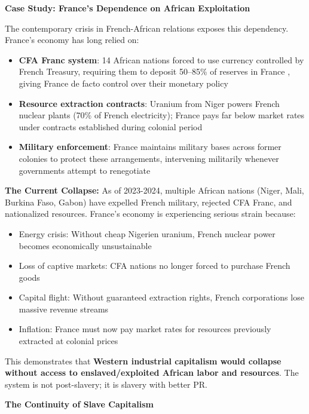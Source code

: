 \documentclass[12pt,openany]{book}
\begin{document}
\textbf{Case Study: France's Dependence on African Exploitation}

The contemporary crisis in French-African relations exposes this dependency. France's economy has long relied on:

\begin{itemize}
    \item \textbf{CFA Franc system}: 14 African nations forced to use currency controlled by French Treasury, requiring them to deposit 50--85\% of reserves in France \cite{pigeaud}, giving France de facto control over their monetary policy
    \item \textbf{Resource extraction contracts}: Uranium from Niger powers French nuclear plants (70\% of French electricity); France pays far below market rates under contracts established during colonial period
    \item \textbf{Military enforcement}: France maintains military bases across former colonies to protect these arrangements, intervening militarily whenever governments attempt to renegotiate
\end{itemize}

\textbf{The Current Collapse:} As of 2023-2024, multiple African nations (Niger, Mali, Burkina Faso, Gabon) have expelled French military, rejected CFA Franc, and nationalized resources. France's economy is experiencing serious strain because:

\begin{itemize}
    \item Energy crisis: Without cheap Nigerien uranium, French nuclear power becomes economically unsustainable
    \item Loss of captive markets: CFA nations no longer forced to purchase French goods
    \item Capital flight: Without guaranteed extraction rights, French corporations lose massive revenue streams
    \item Inflation: France must now pay market rates for resources previously extracted at colonial prices
\end{itemize}

This demonstrates that \textbf{Western industrial capitalism would collapse without access to enslaved/exploited African labor and resources}. The system is not post-slavery; it is slavery with better PR.

\textbf{The Continuity of Slave Capitalism}
\end{document}
